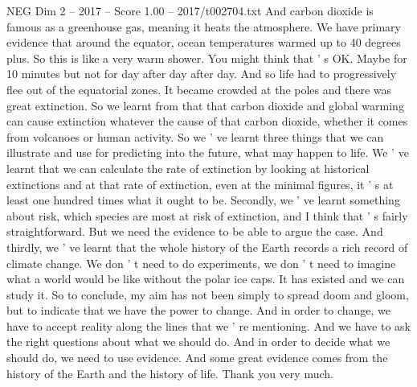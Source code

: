 \begin{textsample}{NEG Dim 2 – 2017 – Score 1.00 – 2017/t002704.txt}
And carbon dioxide is famous as a greenhouse gas, meaning it heats the atmosphere.
We have primary evidence that around the equator, ocean temperatures warmed up to 40 degrees plus.
So this is like a very warm shower.
You might think that ' s OK.
Maybe for 10 minutes but not for day after day after day.
And so life had to progressively flee out of the equatorial zones.
It became crowded at the poles and there was great extinction.
So we learnt from that that carbon dioxide and global warming can cause extinction whatever the cause of that carbon dioxide, whether it comes from volcanoes or human activity.
So we ' ve learnt three things that we can illustrate and use for predicting into the future, what may happen to life.
We ' ve learnt that we can calculate the rate of extinction by looking at historical extinctions and at that rate of extinction, even at the minimal figures, it ' s at least one hundred times what it ought to be.
Secondly, we ' ve learnt something about risk, which species are most at risk of extinction, and I think that ' s fairly straightforward.
But we need the evidence to be able to argue the case.
And thirdly, we ' ve learnt that the whole history of the Earth records a rich record of climate change.
We don ' t need to do experiments, we don ' t need to imagine what a world would be like without the polar ice caps.
It has existed and we can study it.
So to conclude, my aim has not been simply to spread doom and gloom, but to indicate that we have the power to change.
And in order to change, we have to accept reality along the lines that we ' re mentioning.
And we have to ask the right questions about what we should do.
And in order to decide what we should do, we need to use evidence.
And some great evidence comes from the history of the Earth and the history of life.
Thank you very much.

\end{textsample}
